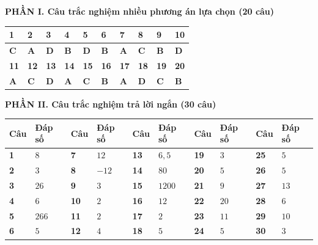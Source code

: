 \documentclass[12pt,a4paper]{article}
\begin{document}
\noindent\textbf{PHẦN I. Câu trắc nghiệm nhiều phương án lựa chọn (20 câu)}
\vspace{1.5pt}
\begin{center}
\renewcommand{\arraystretch}{1.15}
\begin{tabular}{|C{0.95cm}|C{0.95cm}|C{0.95cm}|C{0.95cm}|C{0.95cm}|C{0.95cm}|C{0.95cm}|C{0.95cm}|C{0.95cm}|C{0.95cm}|}
\hline
\textbf{1} & \textbf{2} & \textbf{3} & \textbf{4} & \textbf{5} & \textbf{6} & \textbf{7} & \textbf{8} & \textbf{9} & \textbf{10} \\ \hline
\textbf{C} & \textbf{A} & \textbf{D} & \textbf{B} & \textbf{D} & \textbf{B} & \textbf{A} & \textbf{C} & \textbf{B} & \textbf{D} \\ \hline
\hline
\textbf{11} & \textbf{12} & \textbf{13} & \textbf{14} & \textbf{15} & \textbf{16} & \textbf{17} & \textbf{18} & \textbf{19} & \textbf{20} \\ \hline
\textbf{A} & \textbf{C} & \textbf{D} & \textbf{A} & \textbf{C} & \textbf{B} & \textbf{A} & \textbf{D} & \textbf{C} & \textbf{B} \\ \hline
\end{tabular}
\end{center}

\vspace{3pt}
\noindent\textbf{PHẦN II. Câu trắc nghiệm trả lời ngắn (30 câu)}
\vspace{1.5pt}
\begin{center}
\renewcommand{\arraystretch}{1.15}
\begin{tabular}{|C{0.8cm}|C{1.4cm}||C{0.8cm}|C{1.4cm}||C{0.8cm}|C{1.4cm}||C{0.8cm}|C{1.4cm}||C{0.8cm}|C{1.4cm}|}
\hline
\textbf{Câu} & \textbf{Đáp số} & \textbf{Câu} & \textbf{Đáp số} & \textbf{Câu} & \textbf{Đáp số} & \textbf{Câu} & \textbf{Đáp số} & \textbf{Câu} & \textbf{Đáp số} \\ \hline
\textbf{1}  & $8$      & \textbf{7}  & $12$     & \textbf{13} & $6{,}5$  & \textbf{19} & $3$   & \textbf{25} & $5$  \\ \hline
\textbf{2}  & $3$      & \textbf{8}  & $-12$    & \textbf{14} & $80$     & \textbf{20} & $5$   & \textbf{26} & $5$  \\ \hline
\textbf{3}  & $26$     & \textbf{9}  & $3$      & \textbf{15} & $1200$   & \textbf{21} & $9$   & \textbf{27} & $13$ \\ \hline
\textbf{4}  & $6$      & \textbf{10} & $2$      & \textbf{16} & $12$     & \textbf{22} & $20$  & \textbf{28} & $6$  \\ \hline
\textbf{5}  & $266$    & \textbf{11} & $2$      & \textbf{17} & $2$      & \textbf{23} & $11$  & \textbf{29} & $10$ \\ \hline
\textbf{6}  & $5$      & \textbf{12} & $4$      & \textbf{18} & $5$      & \textbf{24} & $5$   & \textbf{30} & $3$  \\ \hline
\end{tabular}
\end{center}
\end{document}
